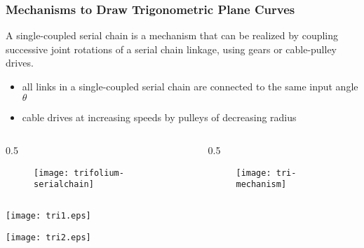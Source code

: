 \documentclass{beamer}
\theoremstyle{theorem}
\theoremstyle{definition}
\begin{document}
\begin{frame}
\frametitle{Mechanisms to Draw Trigonometric Plane Curves}

\begin{definition}
A single-coupled serial chain is a mechanism that can be realized by coupling successive joint rotations of a serial chain linkage, using gears or cable-pulley drives. 
\end{definition}


\begin{itemize}
\item all links in a single-coupled serial chain are connected to the same input angle $\theta$
\item cable drives at increasing speeds by pulleys of decreasing radius
\end{itemize}

\begin{columns}

\begin {column} {0.5\textwidth}
	\begin{center}
		\begin{figure}
		\texttt{[image: trifolium-serialchain]}
		\end{figure}
	\end{center}
\end{column}

\begin{column} {0.5\textwidth}
	\begin{center}	
	\begin{figure}
	\texttt{[image: tri-mechanism]}
	\end{figure}
	\end{center}
\end{column}
\end{columns}

\end{frame}

\begin{frame}
\texttt{[image: tri1.eps]}
\end{frame}

\begin{frame}
\texttt{[image: tri2.eps]}
\end{frame}
\end{document}
